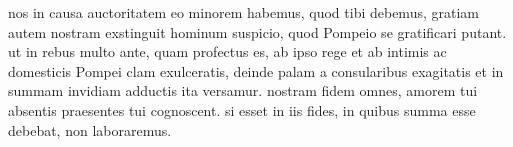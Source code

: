 nos in causa auctoritatem eo minorem habemus, quod tibi debemus, gratiam autem nostram exstinguit hominum suspicio, quod Pompeio se gratificari putant. ut in rebus multo ante, quam profectus es, ab ipso rege et ab intimis ac domesticis Pompei clam exulceratis, deinde palam a consularibus exagitatis et in summam invidiam adductis ita versamur. nostram fidem omnes, amorem tui absentis praesentes tui cognoscent. si esset in iis fides, in quibus summa esse debebat, non laboraremus.
